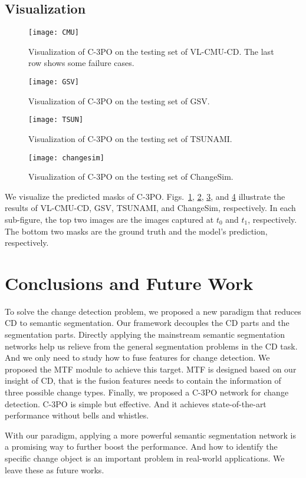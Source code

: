 \documentclass[review]{elsarticle}
\begin{document}
\subsection{Visualization}
\label{sec:visual}

\begin{figure}
	\centering
	\texttt{[image: CMU]}
	\caption{Visualization of C-3PO on the testing set of VL-CMU-CD. The last row shows some failure cases.}
	\label{fig:CMU}
\end{figure}

\begin{figure}
	\centering
	\texttt{[image: GSV]}
	\caption{Visualization of C-3PO on the testing set of GSV.}
	\label{fig:GSV}
\end{figure}

\begin{figure}
	\centering
	\texttt{[image: TSUN]}
	\caption{Visualization of C-3PO on the testing set of TSUNAMI.}
	\label{fig:TSUN}
\end{figure}

\begin{figure}
	\centering
	\texttt{[image: changesim]}
	\caption{Visualization of C-3PO on the testing set of ChangeSim.}
	\label{fig:changesim}
\end{figure}

We visualize the predicted masks of C-3PO. Figs.~\ref{fig:CMU}, \ref{fig:GSV}, \ref{fig:TSUN}, and \ref{fig:changesim} illustrate the results of VL-CMU-CD, GSV, TSUNAMI, and ChangeSim, respectively. In each sub-figure, the top two images are the images captured at $t_0$ and $t_1$, respectively. The bottom two masks are the ground truth and the model's prediction, respectively.

\section{Conclusions and Future Work}

To solve the change detection problem, we proposed a new paradigm that reduces CD to semantic segmentation. Our framework decouples the CD parts and the segmentation parts. Directly applying the mainstream semantic segmentation networks help us relieve from the general segmentation problems in the CD task. And we only need to study how to fuse features for change detection. We proposed the MTF module to achieve this target. MTF is designed based on our insight of CD, that is the fusion features needs to contain the information of three possible change types. Finally, we proposed a C-3PO network for change detection. C-3PO is simple but effective. And it achieves state-of-the-art performance without bells and whistles.

With our paradigm, applying a more powerful semantic segmentation network is a promising way to further boost the performance. And how to identify the specific change object is an important problem in real-world applications. We leave these as future works.


\end{document}

